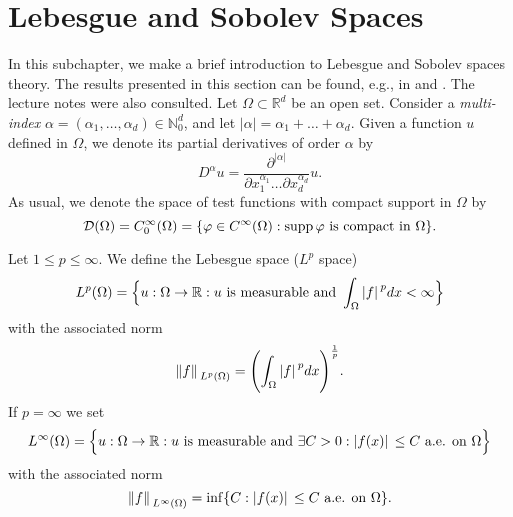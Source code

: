 \section{Lebesgue and Sobolev Spaces}\label{lebesgue_and_sobolev_preliminaries}
In this subchapter, we make a brief introduction to Lebesgue and Sobolev spaces theory. The results presented in this section can be found, e.g., in \cite{lions2012non} and \cite{evans2022partial}. The lecture notes \cite{huguinho} were also consulted. Let $\Omega \subset \mathbb{R}^d$ be an open set. Consider a \textit{multi-index} $\alpha = (\alpha_1, \dots, \alpha_d) \in \mathbb{N}_0^d$, and let $|\alpha| = \alpha_1 + \dots + \alpha_d$. Given a function \(u\) defined in $\Omega$, we denote its partial derivatives of order $\alpha$ by
\[
D^\alpha u = \frac{\partial^{|\alpha|}}{\partial x_1^{\alpha_1}\dots\partial x_d^{\alpha_d}}u.   
\]
As usual, we denote the space of test functions with compact support in $\Omega$ by
\[
\mathcal{D}(\Omega) = C_0^\infty(\Omega) = \{\varphi \in C^\infty(\Omega) : \operatorname{supp}\varphi \text{ is compact in }\Omega\}.
\]

\begin{definition}
    Let \(1 \leq p \leq \infty\). We define the Lebesgue space (\(L^p\) space)
    \[
        L^p(\Omega) = \Big\{u: \Omega \rightarrow \mathbb{R}: u \text{ is measurable and } \int_\Omega \abs*{f}^p dx < \infty\Big\}
    \]
    with the associated norm
    \[
        \norm*{f}_{L^p(\Omega)} = \Biggl(\int_\Omega \abs*{f}^p dx\Biggr)^{\frac{1}{p}}.
    \]
    If \(p=\infty\) we set
    \[
        L^\infty(\Omega) = \Big\{u: \Omega \rightarrow \mathbb{R}: u \text{ is measurable and } \exists C > 0: \abs*{f(x)} \leq C \text{ a.e. on } \Omega \Big\}
    \]
    with the associated norm
    \[
        \norm*{f}_{L^\infty(\Omega)} = \inf \{C: \abs*{f(x)} \leq C \text{ a.e. on } \Omega\}.
    \]
\end{definition}

